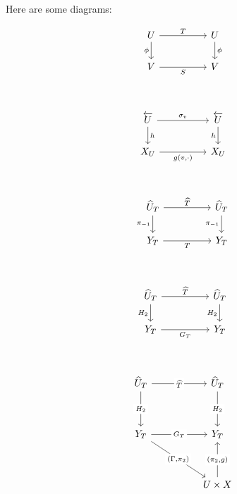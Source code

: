 \documentclass[a4paper,12pt,twoside]{report}
\begin{document}
Here are some diagrams: 


\begin{equation}
\begin{tikzcd}
	U && U \\
	V && V \\
	\arrow["T", from=1-1, to=1-3]
	\arrow["\phi", from=1-3, to=2-3]
	\arrow["\phi"', from=1-1, to=2-1]
	\arrow["S"', from=2-1, to=2-3]
\end{tikzcd}
\end{equation}

\begin{equation}
    \begin{tikzcd}
	{\overleftarrow{U}} && {\overleftarrow{U}} \\
	{X_U} && {X_U} \\
	\arrow["{\sigma_v}", from=1-1, to=1-3]
	\arrow["h"', from=1-3, to=2-3]
	\arrow["h", from=1-1, to=2-1]
	\arrow["{g(v,\cdot)}"', from=2-1, to=2-3]
\end{tikzcd}
\end{equation}

\begin{equation}
\begin{tikzcd}
{\widehat{U}_T} && {\widehat{U}_T} \\
	{Y_T} && {Y_T} \\
\arrow["{\widehat{T}}", from=1-1, to=1-3]
		\arrow["{\pi_{-1}}"', from=1-3, to=2-3]
		\arrow["{\pi_{-1}}"', from=1-1, to=2-1]
	\arrow["{T}"', from=2-1, to=2-3]
\end{tikzcd}
\end{equation}


\begin{equation}
	\begin{tikzcd}
	{\widehat{U}_T} && {\widehat{U}_T} \\
		{Y_T} && {Y_T} \\
	\arrow["{\widehat{T}}", from=1-1, to=1-3]
			\arrow["{H_2}"', from=1-3, to=2-3]
			\arrow["H_2"', from=1-1, to=2-1]
		\arrow["G_T"', from=2-1, to=2-3]
	\end{tikzcd}
	\end{equation}
	


\begin{equation}
\begin{tikzcd}
	{\widehat{U}_T} && {\widehat{U}_T} \\
	\\
	{Y_T} && {Y_T} \\
	\\
	&& {U\times X} \\
		\arrow["{\widehat{T}}"{description}, from=1-1, to=1-3]
	\arrow["{G_T}"{description}', from=3-1, to=3-3]
	\arrow["{H_2}"{description}, from=1-1, to=3-1]
	\arrow["{H_2}"{description}, from=1-3, to=3-3]
	\arrow["{(\Gamma, \pi_2)}"{description}, from=3-1, to=5-3] %
	\arrow["{(\pi_2,g)}"{description}', from=5-3, to=3-3]
\end{tikzcd}
\end{equation}
\end{document}
